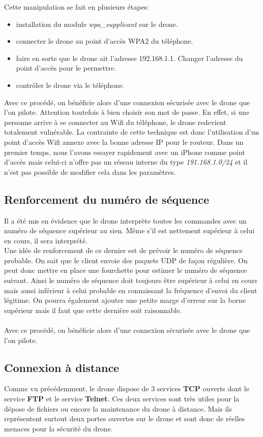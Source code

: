 Cette manipulation se fait en plusieurs étapes:
\begin{itemize}
  \item installation du module \textit{wpa\_supplicant} sur le drone.
  \item connecter le drone au point d'accès WPA2 du téléphone.
  \item faire en sorte que le drone ait l'adresse 192.168.1.1. Changer l'adresse du point d'accès pour le permettre.
  \item contrôler le drone via le téléphone.
\end{itemize}
\medbreak
Avec ce procédé, on bénéficie alors d'une connexion sécurisée avec le drone que l'on pilote. Attention toutefois à bien choisir son mot de passe. En effet, si une personne arrive à se connecter au Wifi du téléphone, le drone redevient totalement vulnérable.
La contrainte de cette technique est donc l'utilisation d'un point d'accès Wifi annexe avec la bonne adresse IP pour le routeur. Dans un premier temps, nous l'avons essayer rapidement avec un iPhone comme point d'accès mais celui-ci n'offre pas un réseau interne du type \textit{191.168.1.0/24} et il n'est pas possible de modifier cela dans les paramètres.

\subsection{Renforcement du numéro de séquence}
Il a été mis en évidence que le drone interprète toutes les commandes avec un numéro de séquence supérieur au sien. Même s'il est nettement supérieur à celui en cours, il sera interprété.\\
Une idée de renforcement de ce dernier est de prévoir le numéro de séquence probable. On sait que le client envoie des paquets UDP de façon régulière. On peut donc mettre en place une fourchette pour estimer le numéro de séquence suivant. Ainsi le numéro de séquence doit toujours être supérieur à celui en cours mais aussi inférieur à celui probable en connaissant la fréquence d’envoi du client légitime. On pourra également ajouter une petite marge d'erreur sur la borne supérieur mais il faut que cette dernière soit raisonnable.\\\\
Avec ce procédé, on bénéficie alors d'une connexion sécurisée avec le drone que l'on pilote.

\subsection{Connexion à distance}
Comme vu précédemment, le drone dispose de 3 services \textbf{TCP} ouverts dont le service \textbf{FTP} et le service \textbf{Telnet}. Ces deux services sont très utiles pour la dépose de fichiers ou encore la maintenance du drone à distance. Mais ils représentent surtout deux portes ouvertes sur le drone et sont donc de réelles menaces pour la sécurité du drone.

